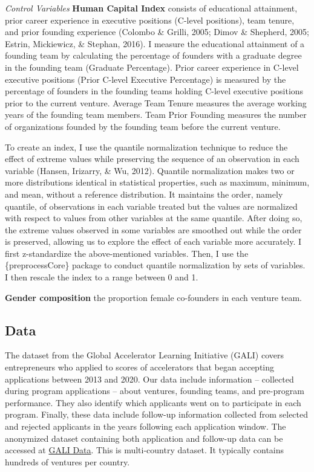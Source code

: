 \documentclass[
  english,
  man]{apa6}
\begin{document}
\emph{Control Variables}
\textbf{Human Capital Index} consists of educational attainment, prior career experience in executive positions (C-level positions), team tenure, and prior founding experience (Colombo \& Grilli, 2005; Dimov \& Shepherd, 2005; Estrin, Mickiewicz, \& Stephan, 2016). I measure the educational attainment of a founding team by calculating the percentage of founders with a graduate degree in the founding team (Graduate Percentage). Prior career experience in C-level executive positions (Prior C-level Executive Percentage) is measured by the percentage of founders in the founding teams holding C-level executive positions prior to the current venture. Average Team Tenure measures the average working years of the founding team members. Team Prior Founding measures the number of organizations founded by the founding team before the current venture.

To create an index, I use the quantile normalization technique to reduce the effect of extreme values while preserving the sequence of an observation in each variable (Hansen, Irizarry, \& Wu, 2012). Quantile normalization makes two or more distributions identical in statistical properties, such as maximum, minimum, and mean, without a reference distribution. It maintains the order, namely quantile, of observations in each variable treated but the values are normalized with respect to values from other variables at the same quantile. After doing so, the extreme values observed in some variables are smoothed out while the order is preserved, allowing us to explore the effect of each variable more accurately. I first z-standardize the above-mentioned variables. Then, I use the \{preprocessCore\} package to conduct quantile normalization by sets of variables. I then rescale the index to a range between 0 and 1.

\textbf{Gender composition} the proportion female co-founders in each venture team.

\hypertarget{data}{%
\subsection{Data}\label{data}}

The dataset from the Global Accelerator Learning Initiative (GALI) covers entrepreneurs who applied to scores of accelerators that began accepting applications between 2013 and 2020. Our data include information -- collected during program applications -- about ventures, founding teams, and pre-program performance. They also identify which applicants went on to participate in each program. Finally, these data include follow-up information collected from selected and rejected applicants in the years following each application window. The anonymized dataset containing both application and follow-up data can be accessed at \href{www.galidata.org/data-request}{GALI Data}. This is multi-country dataset. It typically contains hundreds of ventures per country.
\end{document}
